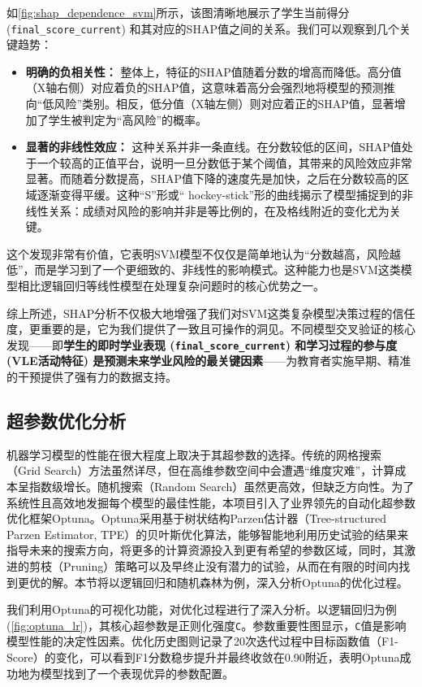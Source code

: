 \documentclass{SYSUReport}
\begin{document}
如\autoref{fig:shap_dependence_svm}所示，该图清晰地展示了学生当前得分 (\texttt{final\_score\_current}) 和其对应的SHAP值之间的关系。我们可以观察到几个关键趋势：
\begin{itemize}
    \item \textbf{明确的负相关性：} 整体上，特征的SHAP值随着分数的增高而降低。高分值（X轴右侧）对应着负的SHAP值，这意味着高分会强烈地将模型的预测推向“低风险”类别。相反，低分值（X轴左侧）则对应着正的SHAP值，显著增加了学生被判定为“高风险”的概率。
    \item \textbf{显著的非线性效应：} 这种关系并非一条直线。在分数较低的区间，SHAP值处于一个较高的正值平台，说明一旦分数低于某个阈值，其带来的风险效应非常显著。而随着分数提高，SHAP值下降的速度先是加快，之后在分数较高的区域逐渐变得平缓。这种“S”形或“ hockey-stick”形的曲线揭示了模型捕捉到的非线性关系：成绩对风险的影响并非是等比例的，在及格线附近的变化尤为关键。
\end{itemize}
这个发现非常有价值，它表明SVM模型不仅仅是简单地认为“分数越高，风险越低”，而是学习到了一个更细致的、非线性的影响模式。这种能力也是SVM这类模型相比逻辑回归等线性模型在处理复杂问题时的核心优势之一。

综上所述，SHAP分析不仅极大地增强了我们对SVM这类复杂模型决策过程的信任度，更重要的是，它为我们提供了一致且可操作的洞见。不同模型交叉验证的核心发现——即\textbf{学生的即时学业表现 (\texttt{final\_score\_current}) 和学习过程的参与度 (VLE活动特征) 是预测未来学业风险的最关键因素}——为教育者实施早期、精准的干预提供了强有力的数据支持。

\subsection{超参数优化分析}
机器学习模型的性能在很大程度上取决于其超参数的选择。传统的网格搜索（Grid Search）方法虽然详尽，但在高维参数空间中会遭遇“维度灾难”，计算成本呈指数级增长。随机搜索（Random Search）虽然更高效，但缺乏方向性。为了系统性且高效地发掘每个模型的最佳性能，本项目引入了业界领先的自动化超参数优化框架Optuna。Optuna采用基于树状结构Parzen估计器（Tree-structured Parzen Estimator, TPE）的贝叶斯优化算法，能够智能地利用历史试验的结果来指导未来的搜索方向，将更多的计算资源投入到更有希望的参数区域，同时，其激进的剪枝（Pruning）策略可以及早终止没有潜力的试验，从而在有限的时间内找到更优的解。本节将以逻辑回归和随机森林为例，深入分析Optuna的优化过程。

我们利用Optuna的可视化功能，对优化过程进行了深入分析。以逻辑回归为例(\ref{fig:optuna_lr})，其核心超参数是正则化强度\texttt{C}。参数重要性图显示，\texttt{C}值是影响模型性能的决定性因素。优化历史图则记录了20次迭代过程中目标函数值（F1-Score）的变化，可以看到F1分数稳步提升并最终收敛在0.90附近，表明Optuna成功地为模型找到了一个表现优异的参数配置。
\end{document}
